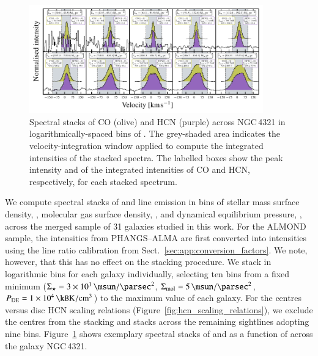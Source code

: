 \documentclass[letter, longauth]{aa} %
\begin{document}
\begin{appendix}
\begin{figure}
\centering
\includegraphics[width=0.9\textwidth]{Figures/ngc4321_almond_stacked_spectra_via_INT_VAL_SD_STAR_compressed.pdf}
\caption{Spectral stacks of CO (olive) and HCN (purple) across NGC\,4321 in logarithmically-spaced bins of \sigstar. The grey-shaded area indicates the velocity-integration window applied to compute the integrated intensities of the stacked spectra. The labelled boxes show the peak intensity and \snr of the integrated intensities of CO and HCN, respectively, for each stacked spectrum.}
\label{fig:ngc4321_stacks}
\end{figure}

We compute spectral stacks of \hcnone and \coone line emission in bins of stellar mass surface density, \sigstar, molecular gas surface density, \sigmol, and dynamical equilibrium pressure, \pde, across the merged sample of 31 galaxies studied in this work.
For the ALMOND sample, the \cotwo intensities from PHANGS--ALMA are first converted into \coone intensities using the line ratio calibration from Sect.~\ref{sec:app:conversion_factors}. 
We note, however, that this has no effect on the stacking procedure. 
We stack in logarithmic bins for each galaxy individually, selecting ten bins from a fixed minimum ($\sigstar=\SI{3e1}{\msun\per\square\parsec}$, $\sigmol=\SI{5e0}{\msun\per\square\parsec}$, $\pde=\SI{1e4}{\kB\kelvin\per\cubic\cm}$) to the maximum value of each galaxy.
For the centres versus disc HCN scaling relations (Figure~\ref{fig:hcn_scaling_relations}), we exclude the centres from the stacking and stacks across the remaining sightlines adopting nine bins.
Figure~\ref{fig:ngc4321_stacks} shows exemplary spectral stacks of \hcnone and \coone as a function of \sigstar across the galaxy NGC\,4321.


\end{appendix}
\end{document}
